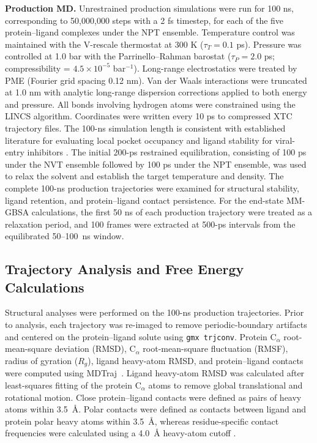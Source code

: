 \documentclass[pharmaceuticals,article,submit,pdftex,moreauthors]{Definitions/mdpi}
\begin{document}
\textbf{Production MD.} Unrestrained production simulations were run for 100 ns, corresponding to 50,000,000 steps with a 2 fs timestep, for each of the five protein--ligand complexes under the NPT ensemble. Temperature control was maintained with the V-rescale thermostat at 300 K ($\tau_T = 0.1$ ps). Pressure was controlled at 1.0 bar with the Parrinello--Rahman barostat ($\tau_P = 2.0$ ps; compressibility = $4.5 \times 10^{-5}$ bar$^{-1}$). Long-range electrostatics were treated by PME (Fourier grid spacing 0.12 nm). Van der Waals interactions were truncated at 1.0 nm with analytic long-range dispersion corrections applied to both energy and pressure. All bonds involving hydrogen atoms were constrained using the LINCS algorithm. Coordinates were written every 10 ps to compressed XTC trajectory files. The 100-ns simulation length is consistent with established literature for evaluating local pocket occupancy and ligand stability for viral-entry inhibitors \cite{gkekas2024ai}. The initial 200-ps restrained equilibration, consisting of 100 ps under the NVT ensemble followed by 100 ps under the NPT ensemble, was used to relax the solvent and establish the target temperature and density. The complete 100-ns production trajectories were examined for structural stability, ligand retention, and protein--ligand contact persistence. For the end-state MM-GBSA calculations, the first 50 ns of each production trajectory were treated as a relaxation period, and 100 frames were extracted at 500-ps intervals from the equilibrated 50--100~ns window.


\subsection{Trajectory Analysis and Free Energy Calculations}

Structural analyses were performed on the 100-ns production trajectories. Prior to analysis, each trajectory was re-imaged to remove periodic-boundary artifacts and centered on the protein--ligand solute using \texttt{gmx trjconv}. Protein C$_\alpha$ root-mean-square deviation (RMSD), C$_\alpha$ root-mean-square fluctuation (RMSF), radius of gyration ($R_g$), ligand heavy-atom RMSD, and protein--ligand contacts were computed using MDTraj~\cite{mcgibbon2015mdtraj}. Ligand heavy-atom RMSD was calculated after least-squares fitting of the protein C$_\alpha$ atoms to remove global translational and rotational motion. Close protein--ligand contacts were defined as pairs of heavy atoms within 3.5~\AA. Polar contacts were defined as contacts between ligand and protein polar heavy atoms within 3.5~\AA, whereas residue-specific contact frequencies were calculated using a 4.0~\AA{} heavy-atom cutoff \cite{jiang2023sars}.
\end{document}
